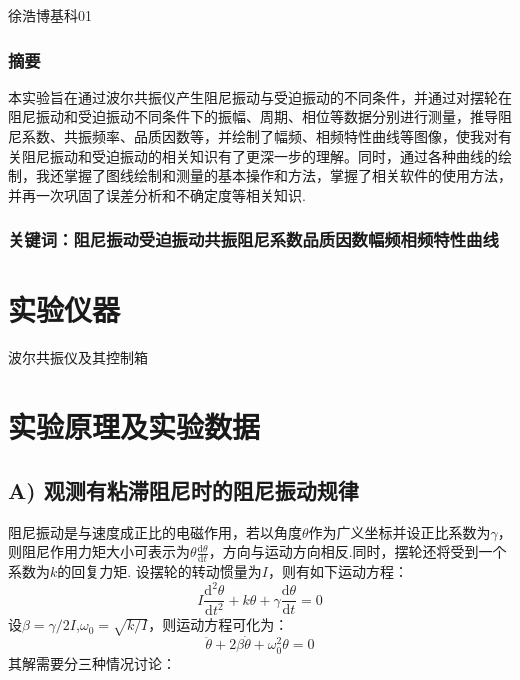 \documentclass[UTF8]{ctexart}
\begin{document}
\renewcommand{\thefootnote}{\fnsymbol{footnote}}
\linespread{1.4}
\title{\vspace{-5em}\vspace{-2.5em}}
\date{}
\maketitle
\begin{center}
{\fangsong 徐浩博\quad 基科01}
\end{center}

\subsubsection*{摘要}
{\kaishu\normalsize 本实验旨在通过波尔共振仪产生阻尼振动与受迫振动的不同条件，并通过对摆轮在阻尼振动和受迫振动不同条件下的振幅、周期、相位等数据分别进行测量，推导阻尼系数、共振频率、品质因数等，并绘制了幅频、相频特性曲线等图像，使我对有关阻尼振动和受迫振动的相关知识有了更深一步的理解。同时，通过各种曲线的绘制，我还掌握了图线绘制和测量的基本操作和方法，掌握了相关软件的使用方法，并再一次巩固了误差分析和不确定度等相关知识. }
\subsubsection*{关键词：阻尼振动\quad 受迫振动\quad 共振\quad 阻尼系数\quad 品质因数\quad 幅频相频特性曲线\vspace{1.5em}}


\section{实验仪器}
波尔共振仪及其控制箱


\section{实验原理及实验数据}
\subsection*{ A) 观测有粘滞阻尼时的阻尼振动规律}
阻尼振动是与速度成正比的电磁作用，若以角度$\theta$作为广义坐标并设正比系数为$\gamma$，则阻尼作用力矩大小可表示为$\theta\frac{\mathrm{d}\theta}{\mathrm{d}t}$，方向与运动方向相反.同时，摆轮还将受到一个系数为$k$的回复力矩. 设摆轮的转动惯量为$I$，则有如下运动方程：
\begin{equation}
I\frac{\mathrm{d}^2\theta}{\mathrm{d}t^2}+k\theta+\gamma\frac{\mathrm{d}\theta}{\mathrm{d}t}=0
\end{equation}
设$\beta=\gamma/2I$,$\omega_0=\sqrt{k/I}$，则运动方程可化为：
\begin{equation}
\ddot{\theta}+2\beta\dot{\theta}+\omega_0^2\theta=0
\end{equation}
其解需要分三种情况讨论：
\end{document}
